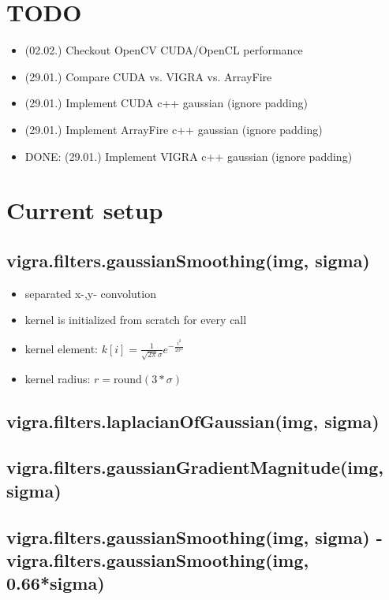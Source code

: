 \documentclass[12pt,a4paper]{article}
\begin{document}
\setlength{\parindent}{0pt}


\section{TODO}
  \begin{itemize}
    \item (02.02.) Checkout OpenCV CUDA/OpenCL performance
    \item (29.01.) Compare CUDA vs. VIGRA vs. ArrayFire
    \item (29.01.) Implement CUDA c++ gaussian (ignore padding)
    \item (29.01.) Implement ArrayFire c++ gaussian (ignore padding)
    \item DONE: (29.01.) Implement VIGRA c++ gaussian (ignore padding)
  \end{itemize}


\section{Current setup}
  \subsection{vigra.filters.gaussianSmoothing(img, sigma)}
    \begin{itemize}
      \item separated x-,y- convolution
      \item kernel is initialized from scratch for every call
      \item kernel element: $k[i] = \frac{1}{\sqrt{2\pi}\sigma} e^{-\frac{i^2}{2\sigma^2}} $
      \item kernel radius: $r = \textrm{round}(3*\sigma)$
    \end{itemize}
  \subsection{vigra.filters.laplacianOfGaussian(img, sigma)}
  \subsection{vigra.filters.gaussianGradientMagnitude(img, sigma)}
  \subsection{vigra.filters.gaussianSmoothing(img, sigma) - vigra.filters.gaussianSmoothing(img, 0.66*sigma)}
\end{document}
